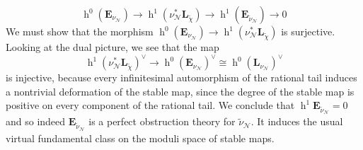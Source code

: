 \documentclass[11pt]{amsart}
\renewcommand{\to}{\rightarrow}
\newcommand{\comp}{\chi}
\newcommand{\h}{\operatorname{h}}
\theoremstyle{definition}
\theoremstyle{definition}
\begin{document}
\begin{equation*} \h^{0}(\mathbf E_{\nu_\mathcal{N}}) \to \h^{1}(\nu_\mathcal{N}^*\mathbf L_{\tilde{\comp}}) \to \h^{1} (\mathbf E_{\tilde{\nu}_{\mathcal{N}}}) \to 0 \end{equation*}
We must show that the morphism $\h^0 (\mathbf{E}_{\nu_{\mathcal{N}}}) \to \h^1(\nu_{\mathcal{N}}^* \mathbf{L}_{\tilde{\comp}})$ is surjective. Looking at the dual picture, we see that the map
\begin{equation*} \h^{1}(\nu_\mathcal{N}^*\mathbf{L}_{\tilde{\comp}})^\vee \to \h^{0}(\mathbf E_{\nu_\mathcal{N}})^\vee \cong \h^{0}(\mathbf{L}_{\nu_\mathcal{N}})^\vee \end{equation*}
is injective, because every infinitesimal automorphism of the rational tail induces a nontrivial deformation of the stable map, since the degree of the stable map is positive on every component of the rational tail. We conclude that $\h^{1}\mathbf E_{\tilde{\nu}_{\mathcal{N}}}=0$ and so indeed $\mathbf{E}_{\tilde{\nu}_{\mathcal{N}}}$ is a perfect obstruction theory for $\tilde{\nu}_{\mathcal{N}}$. It induces the usual virtual fundamental class on the moduli space of stable maps.
\end{document}
